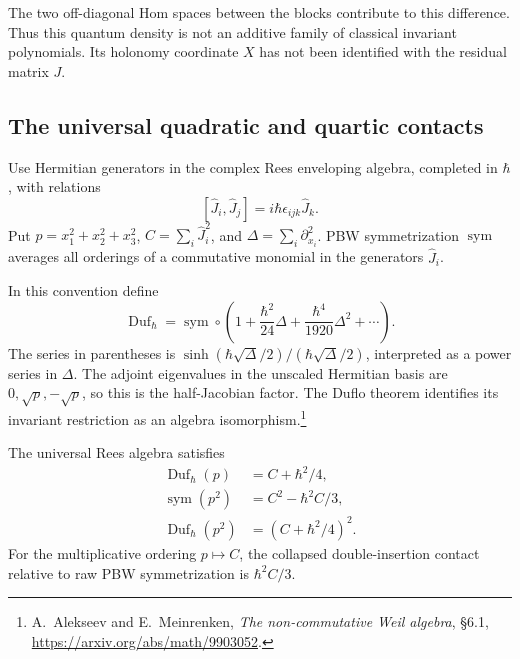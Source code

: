 The two off-diagonal Hom spaces between the blocks contribute
to this difference. Thus this quantum density is not an additive
family of classical invariant polynomials. Its holonomy coordinate
$X$ has not been identified with the residual matrix $J$.

\subsection{The universal quadratic and quartic contacts}

Use Hermitian generators in the complex Rees enveloping algebra,
completed in $\hbar$, with relations
\[
 [\widehat J_i,\widehat J_j]
       =i\hbar\epsilon_{ijk}\widehat J_k.
\]
Put $p=x_1^2+x_2^2+x_3^2$, $C=\sum_i\widehat J_i^2$, and
$\Delta=\sum_i\partial_{x_i}^2$.
PBW symmetrization $\operatorname{sym}$ averages all orderings
of a commutative monomial in the generators $\widehat J_i$.

In this convention define
\begin{equation}\label{mht:eq:su2-duflo-factor}
 \operatorname{Duf}_\hbar
 =\operatorname{sym}\circ
 \left(1+\frac{\hbar^2}{24}\Delta
          +\frac{\hbar^4}{1920}\Delta^2+\cdots\right).
\end{equation}
The series in parentheses is
$\sinh(\hbar\sqrt\Delta/2)/(\hbar\sqrt\Delta/2)$,
interpreted as a power series in $\Delta$.
The adjoint eigenvalues in the unscaled Hermitian basis are
$0,\sqrt p,-\sqrt p$, so this is the half-Jacobian factor.
The Duflo theorem identifies its invariant restriction as an
algebra isomorphism.\footnote{A.~Alekseev and E.~Meinrenken,
\emph{The non-commutative Weil algebra}, \S6.1,
\url{https://arxiv.org/abs/math/9903052}.}

\begin{proposition}\label{mht:prop:su2-ordering-contact}
The universal Rees algebra satisfies
\begin{align}
 \operatorname{Duf}_\hbar(p)&=C+\hbar^2/4,
       \label{mht:eq:su2-quadratic-ordering}\\
 \operatorname{sym}(p^2)&=C^2-\hbar^2C/3,
       \label{mht:eq:su2-quartic-contact}\\
 \operatorname{Duf}_\hbar(p^2)&=(C+\hbar^2/4)^2.
       \label{mht:eq:su2-duflo-product}
\end{align}
For the multiplicative ordering $p\mapsto C$, the collapsed
double-insertion contact relative to raw PBW symmetrization
is $\hbar^2C/3$.
\end{proposition}

